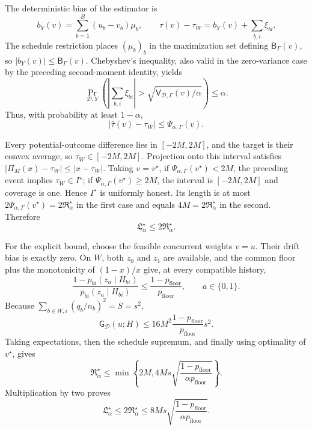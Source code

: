 The deterministic bias of the estimator is
\[
 b_Y(v)=\sum_{b=1}^B(u_b-v_b)\mu_b,
 \qquad
 \widehat\tau(v)-\tau_W=b_Y(v)+\sum_{b,i}\xi_{bi}.
\]
The schedule restriction places \((\mu_b)_b\) in the maximization set defining \(\mathsf B_\Gamma(v)\), so \(|b_Y(v)|\le\mathsf B_\Gamma(v)\).  Chebyshev's inequality, also valid in the zero-variance case by the preceding second-moment identity, yields
\[
 \Pr_{\mathcal D,Y}\!\left(
 \left|\sum_{b,i}\xi_{bi}\right|>
 \sqrt{\overline{\mathsf V}_{\mathcal D,\Gamma}(v)/\alpha}
 \right)\le\alpha.
\]
Thus, with probability at least \(1-\alpha\),
\[
 |\widehat\tau(v)-\tau_W|
 \le\Psi_{\alpha,\Gamma}(v).
\]

Every potential-outcome difference lies in \([-2M,2M]\), and the target is their convex average, so \(\tau_W\in[-2M,2M]\).  Projection onto this interval satisfies \(|\Pi_M(x)-\tau_W|\le|x-\tau_W|\).  Taking \(v=v^\star\), if \(\Psi_{\alpha,\Gamma}(v^\star)<2M\), the preceding event implies \(\tau_W\in I^\star\); if \(\Psi_{\alpha,\Gamma}(v^\star)\ge2M\), the interval is \([-2M,2M]\) and coverage is one.  Hence \(I^\star\) is uniformly honest.  Its length is at most \(2\Psi_{\alpha,\Gamma}(v^\star)=2\mathfrak R_\alpha^\star\) in the first case and equals \(4M=2\mathfrak R_\alpha^\star\) in the second.  Therefore
\[
 \mathfrak L_\alpha^\star\le2\mathfrak R_\alpha^\star.
\]

For the explicit bound, choose the feasible concurrent weights \(v=u\).  Their drift bias is exactly zero.  On \(W\), both \(z_0\) and \(z_1\) are available, and the common floor plus the monotonicity of \((1-x)/x\) give, at every compatible history,
\[
 \frac{1-p_{bi}(z_a\mid H_{bi})}{p_{bi}(z_a\mid H_{bi})}
 \le\frac{1-p_{\mathrm{floor}}}{p_{\mathrm{floor}}},
 \qquad a\in\{0,1\}.
\]
Because \(\sum_{b\in W,i}(q_b/n_b)^2=S=s^2\),
\[
 \mathsf G_{\mathcal D}(u;H)
 \le16M^2\frac{1-p_{\mathrm{floor}}}{p_{\mathrm{floor}}}s^2.
\]
Taking expectations, then the schedule supremum, and finally using optimality of \(v^\star\), gives
\[
 \mathfrak R_\alpha^\star
 \le \min\left\{2M,
 4Ms\sqrt{\frac{1-p_{\mathrm{floor}}}{\alpha p_{\mathrm{floor}}}}\right\}.
\]
Multiplication by two proves
\[
 \mathfrak L_\alpha^\star\le2\mathfrak R_\alpha^\star
 \le8Ms\sqrt{\frac{1-p_{\mathrm{floor}}}{\alpha p_{\mathrm{floor}}}}.
\]

